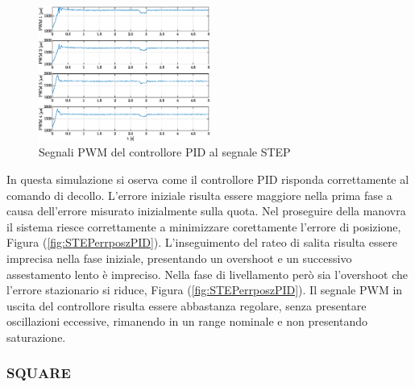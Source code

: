 \begin{figure}
	\centering
	\includegraphics[width=0.5\textwidth]{Simulazioni/Figure/PID/STEP/PWM}
	\caption{Segnali PWM del controllore PID al segnale STEP}
	\label{fig:STEPerrPWMzPID}
\end{figure}

In questa simulazione si oserva come il controllore PID risponda correttamente al comando di decollo. L'errore iniziale risulta essere maggiore nella prima fase a causa dell'errore misurato inizialmente sulla quota. Nel proseguire della manovra il sistema riesce correttamente a minimizzare corettamente l'errore di posizione, Figura (\ref{fig:STEPerrposzPID}). L'inseguimento del rateo di salita risulta essere imprecisa nella fase iniziale, presentando un overshoot e un successivo assestamento lento è impreciso. Nella fase di livellamento però sia l'overshoot che l'errore stazionario si riduce, Figura (\ref{fig:STEPerrposzPID}). Il segnale PWM in uscita del controllore risulta essere abbastanza regolare, senza presentare oscillazioni eccessive, rimanendo in un range nominale e non presentando saturazione.

\subsubsection{SQUARE}

